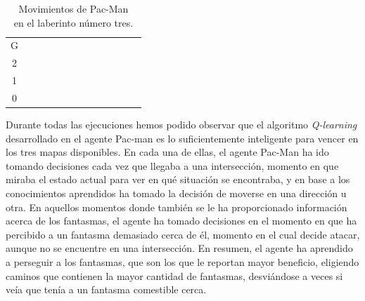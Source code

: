 \documentclass[11pt]{exam}
\begin{document}
\begin{table}[H]
\begin{tabular}{ccccccccccccc}
		\multicolumn{1}{c|}{G} &
		\cellcolor[HTML]{000000} \\ \cline{2-12}
		\multicolumn{1}{c|}{2} &
		\multicolumn{1}{c|}{\cellcolor[HTML]{000000}} &
		\multicolumn{1}{c|}{} &
		\multicolumn{1}{c|}{} &
		\multicolumn{1}{c|}{} &
		\multicolumn{1}{c|}{} &
		\multicolumn{1}{c|}{} &
		\multicolumn{1}{c|}{} &
		\multicolumn{1}{c|}{} &
		\multicolumn{1}{c|}{} &
		\multicolumn{1}{c|}{} &
		\multicolumn{1}{c|}{} &
		\cellcolor[HTML]{000000} \\ \cline{2-12}
		\multicolumn{1}{c|}{1} &
		\multicolumn{1}{c|}{\cellcolor[HTML]{000000}} &
		\multicolumn{1}{c|}{} &
		\multicolumn{1}{c|}{} &
		\multicolumn{1}{c|}{} &
		\multicolumn{1}{c|}{} &
		\multicolumn{1}{c|}{} &
		\multicolumn{1}{c|}{} &
		\multicolumn{1}{c|}{} &
		\multicolumn{1}{c|}{} &
		\multicolumn{1}{c|}{} &
		\multicolumn{1}{c|}{} &
		\cellcolor[HTML]{000000} \\ \cline{2-12}
		\multicolumn{1}{c|}{0} &
		\multicolumn{1}{c|}{\cellcolor[HTML]{000000}} &
		\multicolumn{1}{c|}{\cellcolor[HTML]{000000}} &
		\multicolumn{1}{c|}{\cellcolor[HTML]{000000}} &
		\multicolumn{1}{c|}{\cellcolor[HTML]{000000}} &
		\multicolumn{1}{c|}{\cellcolor[HTML]{000000}} &
		\multicolumn{1}{c|}{\cellcolor[HTML]{000000}} &
		\multicolumn{1}{c|}{\cellcolor[HTML]{000000}} &
		\multicolumn{1}{c|}{\cellcolor[HTML]{000000}} &
		\cellcolor[HTML]{000000}{\color[HTML]{333333} } &
		\cellcolor[HTML]{000000}{\color[HTML]{333333} } &
		\cellcolor[HTML]{000000}{\color[HTML]{333333} } &
		\cellcolor[HTML]{000000}{\color[HTML]{333333} } \\ \cline{2-9}
	\end{tabular}
	\caption{Movimientos de Pac-Man \\ en el laberinto número tres.}
	\label{tabla_lab3}
\end{table}

Durante todas las ejecuciones hemos podido observar que el algoritmo \textit{Q-learning} desarrollado en el agente Pac-man es lo suficientemente inteligente para vencer en los tres mapas disponibles. En cada una de ellas, el agente Pac-Man ha ido tomando decisiones cada vez que llegaba a una intersección, momento en que miraba el estado actual para ver en qué situación se encontraba, y en base a los conocimientos aprendidos ha tomado la decisión de moverse en una dirección u otra. En aquellos momentos donde también se le ha proporcionado información acerca de los fantasmas, el agente ha tomado decisiones en el momento en que ha percibido a un fantasma demasiado cerca de él, momento en el cual decide atacar, aunque no se encuentre en una intersección. En resumen, el agente ha aprendido a perseguir a los fantasmas, que son los que le reportan mayor beneficio, eligiendo caminos que contienen la mayor cantidad de fantasmas, desviándose a veces si veía que tenía a un fantasma comestible cerca.
\end{document}
